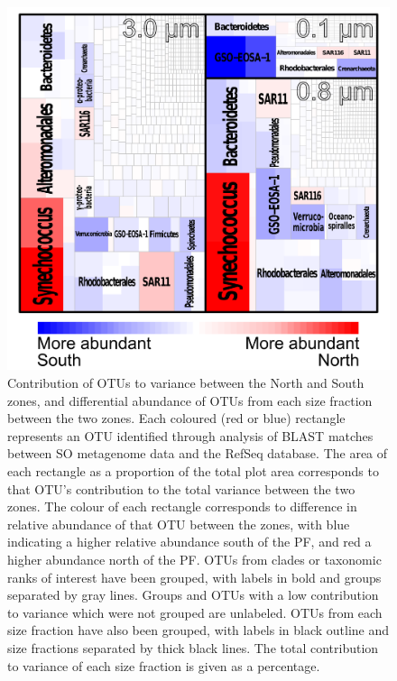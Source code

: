 \begin{figure}
  \centering
  \includegraphics[width=\textwidth]{../polarfront/taxotreemap.png}
  \caption[Contribution of \acp{OTU} to variance between the North and South zones]{Contribution of OTUs to variance between the North and South zones, and differential abundance of OTUs from each size fraction between the two zones.
Each coloured (red or blue) rectangle represents an OTU identified through analysis of BLAST matches between SO metagenome data and the RefSeq database.
The area of each rectangle as a proportion of the total plot area corresponds to that OTU's contribution to the total variance between the two zones.
The colour of each rectangle corresponds to difference in relative abundance of that OTU between the zones, with blue indicating a higher relative abundance south of the PF, and red a higher abundance north of the PF.
OTUs from clades or taxonomic ranks of interest have been grouped, with labels in bold and groups separated by gray lines. 
Groups and OTUs with a low contribution to variance which were not grouped are unlabeled.
OTUs from each size fraction have also been grouped, with labels in black outline and size fractions separated by thick black lines. 
The total contribution to variance of each size fraction is given as a percentage.}
  \label{fig:taxotreemap}
\end{figure}
